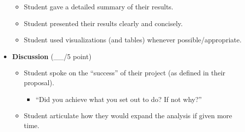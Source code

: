 \documentclass[
  11pt,
]{article}
\providecommand{\tightlist}{%
  \setlength{\itemsep}{0pt}\setlength{\parskip}{0pt}}
\begin{document}
\begin{itemize}
  \begin{itemize}
  \item
    Student gave a detailed summary of their results.
  \item
    Student presented their results clearly and concisely.
  \item
    Student used visualizations (and tables) whenever
    possible/appropriate.
  \end{itemize}
\item
  \textbf{Discussion} (\_\_/5 point)

  \begin{itemize}
  \tightlist
  \item
    Student spoke on the ``success'' of their project (as defined in
    their proposal).

    \begin{itemize}
    \tightlist
    \item
      ``Did you achieve what you set out to do? If not why?''
    \end{itemize}
  \item
    Student articulate how they would expand the analysis if given more
    time.
  \end{itemize}
\end{itemize}
\end{document}
